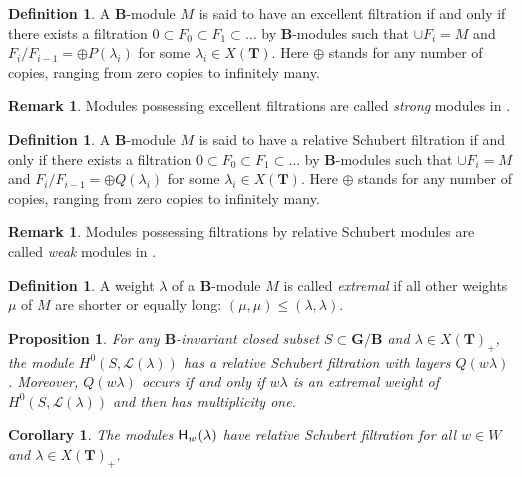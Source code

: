 \documentclass[sn-mathphys-num]{sn-jnl}%
\newcommand{\Ll}{\mathcal L}
\newcommand{\sH}{{\sf H}}
\newcommand{\bg}{\mathbf G}
\newcommand{\fb}{\mathbf B}
\newcommand{\bt}{\mathbf T}
\newtheorem{corollary}[theorem]{Corollary}
\newtheorem{proposition}[theorem]{Proposition}
\theoremstyle{definition}
\newtheorem{definition}[theorem]{Definition}%
\newtheorem{remark}[theorem]{Remark}
\begin{document}
\begin{definition}\cite[Definition 2.3.6]{WvdKTata}
A $\fb$-module $M$ is said to have an excellent filtration if and only if there exists a filtration $0\subset F_0\subset F_1\subset \dots $ by $\fb$-modules such that $\cup F_i= M$ and $F_i/F_{i-1}=\oplus P(\lambda _i)$ for some $\lambda _i\in X( \bt)$. Here $\oplus$ stands for any number of copies, ranging from zero copies to infinitely many.
\end{definition}

\begin{remark}
Modules possessing excellent filtrations are called {\it strong} modules in \cite{Math}.
\end{remark}

\begin{definition}\cite[Definition 2.3.8]{WvdKTata}
A $\fb$-module $M$ is said to have a relative Schubert filtration if and only if there exists a filtration $0\subset F_0\subset F_1\subset \dots $ by $\fb$-modules such that $\cup F_i= M$ and $F_i/F_{i-1}=\oplus Q(\lambda _i)$ for some $\lambda _i\in X( \bt)$. Here $\oplus$ stands for any number of copies, ranging from zero copies to infinitely many.
\end{definition}

\begin{remark}
Modules possessing filtrations by relative Schubert modules are called {\it weak} modules in \cite{Math}.
\end{remark}
\begin{definition}
A weight $\lambda$ of a $\fb$-module $M$ is called \emph{extremal} if all other weights $\mu$
of $M$ are shorter or equally long:
$(\mu,\mu)\leq(\lambda,\lambda)$.   
\end{definition}

\begin{proposition}\cite[Proposition 2.3.11]{WvdKTata}\label{prop:multone}
For any $\fb$-invariant closed subset $S\subset   \bg / \fb$ and $\lambda \in X( \bt)_+$, the module $H^0(S,\Ll (\lambda))$ has a relative Schubert filtration with layers $Q(w\lambda)$. Moreover, $Q(w\lambda)$ occurs if and only if $w\lambda$ is an extremal weight of $H^0(S,\Ll (\lambda))$ and then has multiplicity one. 
\end{proposition}

\begin{corollary}\cite[Corollary 2.3.12]{WvdKTata}
The modules ${\sH}_w(\lambda)$ have relative Schubert filtration for all $w\in W$ and $\lambda \in X( \bt)_+$.
\end{corollary} 
\end{document}
